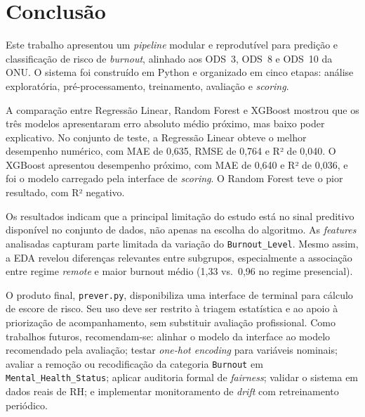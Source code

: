 \documentclass[conference]{IEEEtran}
\begin{document}
\section{Conclusão}
\label{sec:conc}

Este trabalho apresentou um \textit{pipeline} modular e reprodutível para
predição e classificação de risco de \textit{burnout}, alinhado aos ODS~3,
ODS~8 e ODS~10 da ONU. O sistema foi construído em Python e organizado em
cinco etapas: análise exploratória, pré-processamento, treinamento,
avaliação e \textit{scoring}.

A comparação entre Regressão Linear, Random Forest e XGBoost mostrou que
os três modelos apresentaram erro absoluto médio próximo, mas baixo poder
explicativo. No conjunto de teste, a Regressão Linear obteve o melhor
desempenho numérico, com MAE de 0,635, RMSE de 0,764 e R² de 0,040. O
XGBoost apresentou desempenho próximo, com MAE de 0,640 e R² de 0,036, e
foi o modelo carregado pela interface de \textit{scoring}. O Random Forest
teve o pior resultado, com R² negativo.

Os resultados indicam que a principal limitação do estudo está no sinal
preditivo disponível no conjunto de dados, não apenas na escolha do
algoritmo. As \textit{features} analisadas capturam parte limitada da
variação do \texttt{Burnout_Level}. Mesmo assim, a EDA revelou diferenças
relevantes entre subgrupos, especialmente a associação entre regime
\textit{remote} e maior burnout médio (1,33 vs.\ 0,96 no regime presencial).

O produto final, \texttt{prever.py}, disponibiliza uma interface de terminal
para cálculo de escore de risco. Seu uso deve ser restrito à triagem
estatística e ao apoio à priorização de acompanhamento, sem substituir
avaliação profissional. Como trabalhos futuros, recomendam-se: alinhar o
modelo da interface ao modelo recomendado pela avaliação; testar
\textit{one-hot encoding} para variáveis nominais; avaliar a remoção ou
recodificação da categoria \texttt{Burnout} em
\texttt{Mental_Health_Status}; aplicar auditoria formal de
\textit{fairness}; validar o sistema em dados reais de RH; e implementar
monitoramento de \textit{drift} com retreinamento periódico.
\end{document}
